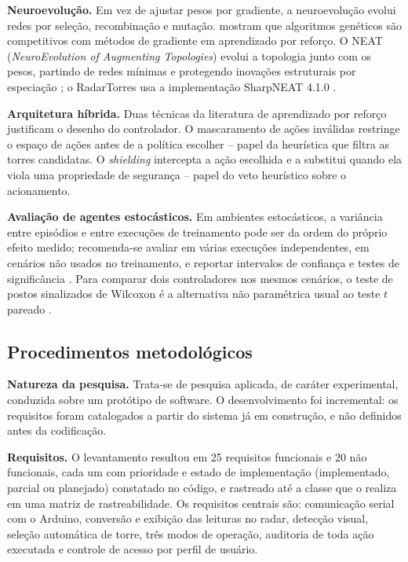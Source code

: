 \documentclass[12pt,a4paper]{article}
\begin{document}
\textbf{Neuroevolução.} Em vez de ajustar pesos por gradiente, a neuroevolução evolui redes por
seleção, recombinação e mutação.  mostram que algoritmos
genéticos são competitivos com métodos de gradiente em aprendizado por reforço. O NEAT
(\textit{NeuroEvolution of Augmenting Topologies}) evolui a topologia junto com os pesos, partindo de
redes mínimas e protegendo inovações estruturais por especiação \cite{stanley2002neat}; o
RadarTorres usa a implementação SharpNEAT 4.1.0 \cite{sharpneat}.

\textbf{Arquitetura híbrida.} Duas técnicas da literatura de aprendizado por reforço justificam o
desenho do controlador. O mascaramento de ações inválidas restringe o espaço de ações antes de a
política escolher \cite{huang2020actionmasking} -- papel da heurística que filtra as torres
candidatas. O \textit{shielding} intercepta a ação escolhida e a substitui quando ela viola uma
propriedade de segurança \cite{alshiekh2017shielding} -- papel do veto heurístico sobre o
acionamento.

\textbf{Avaliação de agentes estocásticos.} Em ambientes estocásticos, a variância entre episódios
e entre execuções de treinamento pode ser da ordem do próprio efeito medido; recomenda-se avaliar
em várias execuções independentes, em cenários não usados no treinamento, e reportar intervalos de
confiança e testes de significância \cite{henderson2018drlthatmatters,colas2018howmanyseeds}. Para
comparar dois controladores nos mesmos cenários, o teste de postos sinalizados de Wilcoxon é a
alternativa não paramétrica usual ao teste $t$ pareado \cite{wilcoxon1945,derrac2011nonparametric}.

\subsection{Procedimentos metodológicos}
\label{sec:metodologia}

\textbf{Natureza da pesquisa.} Trata-se de pesquisa aplicada, de caráter experimental, conduzida
sobre um protótipo de software. O desenvolvimento foi incremental: os requisitos foram catalogados a
partir do sistema já em construção, e não definidos antes da codificação.

\textbf{Requisitos.} O levantamento resultou em 25 requisitos funcionais e 20 não funcionais, cada
um com prioridade e estado de implementação (implementado, parcial ou planejado) constatado no
código, e rastreado até a classe que o realiza em uma matriz de rastreabilidade. Os requisitos
centrais são: comunicação serial com o Arduino, conversão e exibição das leituras no radar,
detecção visual, seleção automática de torre, três modos de operação, auditoria de toda ação
executada e controle de acesso por perfil de usuário.
\end{document}
